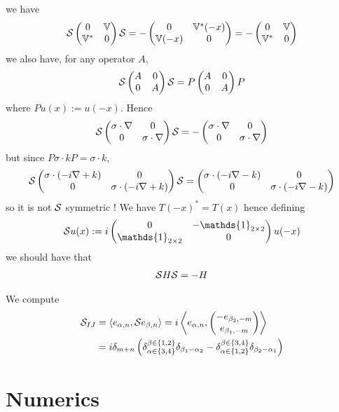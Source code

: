 \documentclass[11pt,a4paper,reqno,french,tikz]{amsart}
\newcommand{\pa}[1]{\left( #1 \right)} %
\newcommand{\acs}[1]{\left\{ #1 \right\}} %
\newcommand{\ps}[1]{\left< #1 \right>} %
\newcommand{\na}{\nabla} %
\newcommand{\mat}[1]{\begin{pmatrix} #1 \end{pmatrix}} %
\def\1{{\mathds{1}}}
\newcommand{\bbV}{\mathbb{V}}
\begin{document}
we have
\begin{align*}
\cS \mat{0 & \bbV \\ \bbV^* & 0} \cS = -\mat{0 & \bbV^*(-x) \\ \bbV(-x) & 0} = - \mat{0 & \bbV \\ \bbV^* & 0}
\end{align*}
we also have, for any operator $A$,
\begin{align*}
	\cS \mat{A & 0 \\ 0 & A} \cS = P \mat{A & 0 \\ 0 & A} P
\end{align*}
where $Pu(x) := u(-x)$. Hence
\begin{align*}
	\cS \mat{\sigma \cdot \na & 0 \\ 0 & \sigma \cdot \na} \cS = - \mat{\sigma \cdot \na & 0 \\ 0 & \sigma \cdot \na}
\end{align*}
but since $P \sigma \cdot k P = \sigma \cdot k$, 
\begin{align*}
	\cS \mat{\sigma \cdot \pa{-i\na + k} & 0 \\ 0 & \sigma \cdot \pa{-i\na + k}} \cS = \mat{\sigma \cdot \pa{-i\na -k} & 0 \\ 0 & \sigma \cdot \pa{-i\na -k}} 
\end{align*}
so it is not $\mathcal{S}$ symmetric ! We have $T(-x)^* = T(x)$ hence defining
\begin{align*}
\cS u(x) := i \mat{0 & -\1_{2\times 2} \\ \1_{2\times 2} & 0} u(-x)
\end{align*}
we should have that
\begin{align*}
\mathcal{S} H \mathcal{S} = - H
\end{align*}

We compute
\begin{align*}
	\cS_{IJ} &= \ps{e_{\alpha,n},\cS e_{\beta,n}} = i \ps{e_{\alpha,n}, \mat{-e_{\beta_2,-m} \\ e_{\beta_1,-m}}} \\
&= i \delta_{m+n} \pa{\delta_{\alpha \in \acs{3,4}}^{\beta \in \acs{1,2}} \delta_{\beta_1-\alpha_2} -\delta_{\alpha \in \acs{1,2}}^{\beta \in \acs{3,4}}\delta_{\beta_2-\alpha_1}}
\end{align*}

\section{Numerics}%
\label{sec:numerics}
\end{document}

